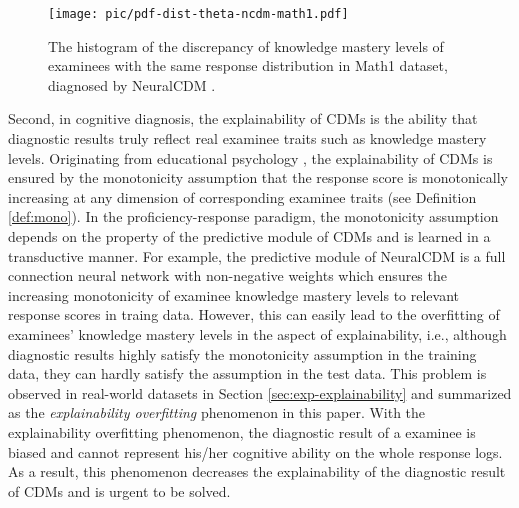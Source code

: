 \documentclass[sigconf]{acmart}
\begin{document}
\begin{figure}[t]
  \centering
  \texttt{[image: pic/pdf-dist-theta-ncdm-math1.pdf]}
  \vspace{-5pt}
  \caption{The histogram of the discrepancy of knowledge mastery levels of examinees with the same response distribution in Math1 dataset, diagnosed by NeuralCDM \cite{WangF2022}.}
  \label{fig:pdf-overview}
  \vspace{-5pt}
\end{figure}


\par Second, in cognitive diagnosis, the explainability of CDMs is the ability that diagnostic results truly reflect real examinee traits such as knowledge mastery levels. Originating from educational psychology \cite{Reckase2009}, the explainability of CDMs is ensured by the monotonicity assumption \cite{WangF2022} that the response score is monotonically increasing at any dimension of corresponding examinee traits (see Definition \ref{def:mono}). In the proficiency-response paradigm, the monotonicity assumption depends on the property of the predictive module of CDMs and is learned in a transductive manner. For example, the predictive module of NeuralCDM is a full connection neural network with non-negative weights which ensures the increasing monotonicity of examinee knowledge mastery levels to relevant response scores in traing data. However, this can easily lead to the overfitting of examinees' knowledge mastery levels in the aspect of explainability, i.e., although diagnostic results highly satisfy the monotonicity assumption in the training data, they can hardly satisfy the assumption in the test data. This problem is observed in real-world datasets in Section \ref{sec:exp-explainability} and summarized as the \textit{explainability overfitting} phenomenon in this paper. With the explainability overfitting phenomenon, the diagnostic result of a examinee is biased and cannot represent his/her cognitive ability on the whole response logs. As a result, this phenomenon decreases the explainability of the diagnostic result of CDMs and is urgent to be solved.
\end{document}
